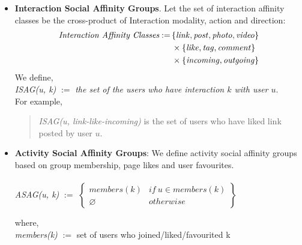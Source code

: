 \begin{itemize}
  \item \textbf{Interaction  Social Affinity Groups}. Let the set of interaction affinity classes be the cross-product of 
  Interaction modality, action and direction:
  \begin{align*}
  	\textit{Interaction Affinity Classes} := \, & \{\link, \post, \photo, \video\} \\
                                                & \times \{\like, \ttag, \comment\} \\
                                                & \times \{\incoming, \outgoing\}
  \end{align*}
  We define,\\
  \textit{ISAG(u, k)} $:=$ \textit{the set of the users who have interaction $k$ with user $u$}.\\
   For example,
   \begin{quote}
   \textit{ISAG(u, link-like-incoming)}  is the set of users who have liked link posted by user $u$. \\
   \end{quote}
\item \textbf{Activity Social Affinity Groups}: We define activity social affinity groups based on group membership, page likes and user favourites.\\ \\
	\textit{ASAG(u, k)} $:=$
							\begin{math} 
							\begin{Bmatrix}
								members(k) & if\ u \in members(k)\\ 	
								\varnothing & otherwise
							\end{Bmatrix}
							\end{math}
					
	where, \\ \textit{members(k)} $:=$ set of users who joined/liked/favourited k
\end{itemize}


